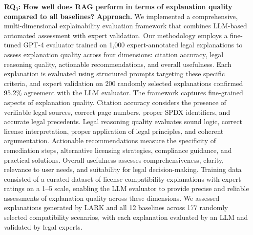\begin{comment}
\begin{figure}
\centering 
\texttt{[image: Images/wordcloud8.PNG]}
\caption{Popular license compatibility textual patterns in issues.}
\label{fig:Top Keywords}
\end{figure}

\end{comment}





\textbf{RQ$_3$: How well does RAG perform in terms of explanation quality compared to all baselines?}
\noindent\textbf{Approach.}
We implemented a comprehensive, multi-dimensional explainability evaluation framework that combines LLM-based automated assessment with expert validation. Our methodology employs a fine-tuned GPT-4 evaluator trained on 1,000 expert-annotated legal explanations to assess explanation quality across four dimensions: citation accuracy, legal reasoning quality, actionable recommendations, and overall usefulness. Each explanation is evaluated using structured prompts targeting these specific criteria, and expert validation on 200 randomly selected explanations confirmed 95.2\% agreement with the LLM evaluator. The framework captures fine-grained aspects of explanation quality. Citation accuracy considers the presence of verifiable legal sources, correct page numbers, proper SPDX identifiers, and accurate legal precedents. Legal reasoning quality evaluates sound logic, correct license interpretation, proper application of legal principles, and coherent argumentation. Actionable recommendations measure the specificity of remediation steps, alternative licensing strategies, compliance guidance, and practical solutions. Overall usefulness assesses comprehensiveness, clarity, relevance to user needs, and suitability for legal decision-making. Training data consisted of a curated dataset of license compatibility explanations with expert ratings on a 1–5 scale, enabling the LLM evaluator to provide precise and reliable assessments of explanation quality across these dimensions.
We assessed explanations generated by LARK and all 12 baselines across 177 randomly selected compatibility scenarios, with each explanation evaluated by an LLM and validated by legal experts.

